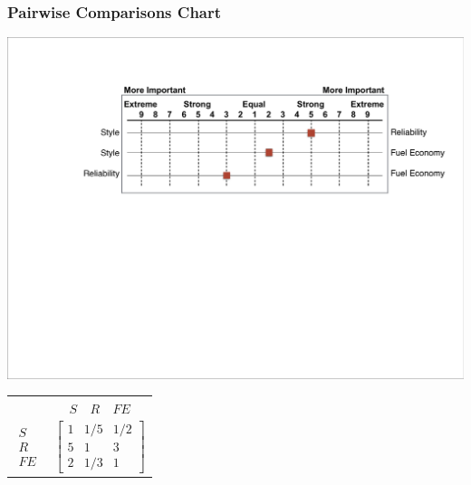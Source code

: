\documentclass[10pt,handout,hyperref={colorlinks=true,linkcolor=blue,citecolor=citelink,urlcolor=gray}]{beamer}
\newcounter{e_temp}
\begin{document}
\begin{frame}
\frametitle{Pairwise Comparisons Chart}
\begin{center}
\includegraphics[width=.9\textwidth]{ComparisonChart}
\pause
\vspace{3ex}

\begin{tabular}{c@{\,}c}
	& $\begin{array}{ccc} S \  & R & \ FE \end{array}$ \\
  $\begin{array}{r} S \\ R \\ FE \end{array}$
	& $\begin{bmatrix}
	1 & 1/5 & 1/2 \\
	5 & 1	    & 3    \\
	2 & 1/3 & 1
	\end{bmatrix}$
\end{tabular} \quad \mbox{\phantom{XXX}}

\end{center}
\end{frame}
\end{document}

